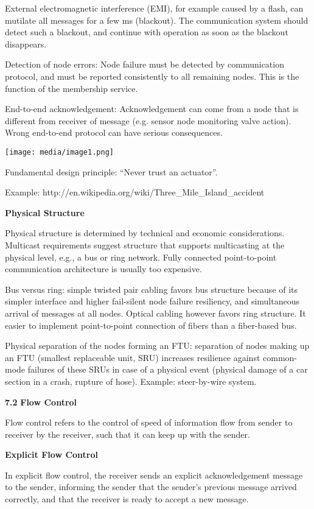 External electromagnetic interference (EMI), for example caused by a
flash, can mutilate all messages for a few ms (blackout). The
communication system should detect such a blackout, and continue with
operation as soon as the blackout disappears.

Detection of node errors: Node failure must be detected by communication
protocol, and must be reported consistently to all remaining nodes. This
is the function of the membership service.

End-to-end acknowledgement: Acknowledgement can come from a node that is
different from receiver of message (e.g. sensor node monitoring valve
action). Wrong end-to-end protocol can have serious consequences.

\texttt{[image: media/image1.png]}

Fundamental design principle: ``Never trust an actuator''.

Example: http://en.wikipedia.org/wiki/Three\_Mile\_Island\_accident

\textbf{Physical Structure}

Physical structure is determined by technical and economic
considerations. Multicast requirements suggest structure that supports
multicasting at the physical level, e.g., a bus or ring network. Fully
connected point-to-point communication architecture is usually too
expensive.

Bus versus ring: simple twisted pair cabling favors bus structure
because of its simpler interface and higher fail-silent node failure
resiliency, and simultaneous arrival of messages at all nodes. Optical
cabling however favors ring structure. It easier to implement
point-to-point connection of fibers than a fiber-based bus.

Physical separation of the nodes forming an FTU: separation of nodes
making up an FTU (smallest replaceable unit, SRU) increases resilience
against common-mode failures of these SRUs in case of a physical event
(physical damage of a car section in a crash, rupture of hose). Example:
steer-by-wire system.

\textbf{7.2} \protect\hypertarget{teil3}{}{}\textbf{Flow Control }

Flow control refers to the control of speed of information flow from
sender to receiver by the receiver, such that it can keep up with the
sender.

\textbf{Explicit Flow Control}

In explicit flow control, the receiver sends an explicit acknowledgement
message to the sender, informing the sender that the sender's previous
message arrived correctly, and that the receiver is ready to accept a
new message.

